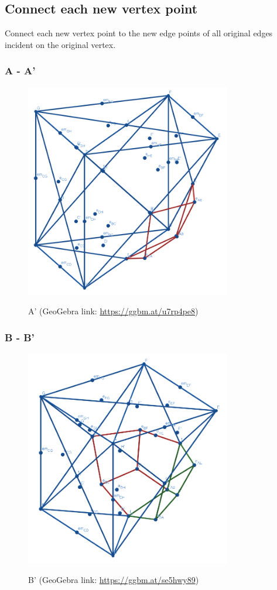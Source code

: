 \documentclass{article}
\begin{document}
\subsection{Connect each new vertex point}
Connect each new vertex point to the new edge points of all original edges incident on the original vertex.
\subsubsection{A - A'}
\begin{figure}[H]
\caption{A' (GeoGebra link: \href{https://ggbm.at/u7rp4pe8}{https://ggbm.at/u7rp4pe8})}
\centering
\includegraphics[width=0.8\textwidth]{images/cl-07-1.png}
\label{fig:cube7-1}
\end{figure}
\subsubsection{B - B'}
\begin{figure}[H]
\caption{B' (GeoGebra link: \href{https://ggbm.at/se5hwy89}{https://ggbm.at/se5hwy89})}
\centering
\includegraphics[width=0.8\textwidth]{images/cl-07-2.png}
\label{fig:cube7-2}
\end{figure}
\end{document}

